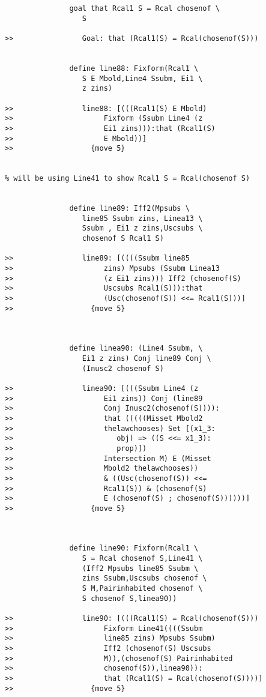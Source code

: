 \documentclass[12pt]{article}
\begin{document}
\begin{verbatim}
               goal that Rcal1 S = Rcal chosenof \
                  S

>>                Goal: that (Rcal1(S) = Rcal(chosenof(S)))


               define line88: Fixform(Rcal1 \
                  S E Mbold,Line4 Ssubm, Ei1 \
                  z zins)

>>                line88: [(((Rcal1(S) E Mbold)
>>                     Fixform (Ssubm Line4 (z
>>                     Ei1 zins))):that (Rcal1(S)
>>                     E Mbold))]
>>                  {move 5}


% will be using Line41 to show Rcal1 S = Rcal(chosenof S)


               define line89: Iff2(Mpsubs \
                  line85 Ssubm zins, Linea13 \
                  Ssubm , Ei1 z zins,Uscsubs \
                  chosenof S Rcal1 S)

>>                line89: [((((Ssubm line85
>>                     zins) Mpsubs (Ssubm Linea13
>>                     (z Ei1 zins))) Iff2 (chosenof(S)
>>                     Uscsubs Rcal1(S))):that
>>                     (Usc(chosenof(S)) <<= Rcal1(S)))]
>>                  {move 5}



               define linea90: (Line4 Ssubm, \
                  Ei1 z zins) Conj line89 Conj \
                  (Inusc2 chosenof S)

>>                linea90: [(((Ssubm Line4 (z
>>                     Ei1 zins)) Conj (line89
>>                     Conj Inusc2(chosenof(S)))):
>>                     that (((((Misset Mbold2
>>                     thelawchooses) Set [(x1_3:
>>                        obj) => ((S <<= x1_3):
>>                        prop)])
>>                     Intersection M) E (Misset
>>                     Mbold2 thelawchooses))
>>                     & ((Usc(chosenof(S)) <<=
>>                     Rcal1(S)) & (chosenof(S)
>>                     E (chosenof(S) ; chosenof(S))))))]
>>                  {move 5}



               define line90: Fixform(Rcal1 \
                  S = Rcal chosenof S,Line41 \
                  (Iff2 Mpsubs line85 Ssubm \
                  zins Ssubm,Uscsubs chosenof \
                  S M,Pairinhabited chosenof \
                  S chosenof S,linea90))

>>                line90: [(((Rcal1(S) = Rcal(chosenof(S)))
>>                     Fixform Line41((((Ssubm
>>                     line85 zins) Mpsubs Ssubm)
>>                     Iff2 (chosenof(S) Uscsubs
>>                     M)),(chosenof(S) Pairinhabited
>>                     chosenof(S)),linea90)):
>>                     that (Rcal1(S) = Rcal(chosenof(S))))]
>>                  {move 5}




\end{verbatim}
\end{document}
